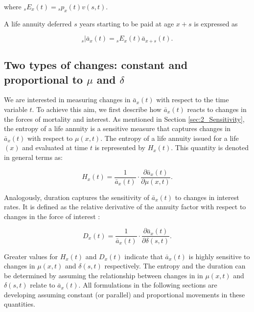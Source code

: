 \documentclass[12pt]{article}
\begin{document}
where ${}_sE_x(t)={}_sp_x(t) {v}(s,t)$. 

A life annuity deferred $s$ years starting to be paid at age $x+s$ is expressed as

\begin{equation}\label{eq:DefAnnuity}
{}_s|\bar{a}_x(t) = {}_sE_x(t) \bar{a}_{x+s}(t).
\end{equation}


\subsection{Two types of changes: constant and proportional to $\mu$ and $\delta$}


We are interested in measuring changes in $\bar{a}_x(t)$ with respect to the time variable $t$. To achieve this aim, we first describe how $\bar{a}_x(t)$ reacts to changes in the forces of mortality and interest. As mentioned in Section \ref{sec:2_Sensitivity}, the entropy of a life annuity is a sensitive measure that captures changes in $\bar{a}_x(t)$ with respect to $\mu(x,t)$. The entropy of a life annuity issued for a life $(x)$ and evaluated at time $t$ is represented by ${H}_{x}(t)$. This quantity is denoted in general terms as:

\begin{equation}\label{eq:EntropyGeneral}
{H}_{x}(t) = \frac{ 1}{\bar{a}_x(t)}\cdot \frac{\partial \bar{a}_x(t) }{\partial \mu(x,t)}.
\end{equation}

Analogously, duration captures the sensitivity of $\bar{a}_x(t)$ to changes in interest rates. It is defined as the relative derivative of the annuity factor with respect to changes in the force of interest \citep{Milevsky2012,Milevsky2012a}:


\begin{equation}\label{eq:DurationGeneral}
{D}_{x}(t) = \frac{1}{\bar{a}_x(t)}\cdot  \frac{\partial \bar{a}_x(t) }{\partial \delta(s,t)}.
\end{equation}

Greater values for ${H}_{x}(t)$ and ${D}_{x}(t)$ indicate that $\bar{a}_x(t)$ is highly sensitive to changes in $\mu(x,t)$ and $\delta(s,t)$ respectively. The entropy and the duration can be determined by assuming the relationship between changes in in $\mu(x,t)$ and $\delta(s,t)$ relate to $\bar{a}_x(t)$. All formulations in the following sections are developing assuming constant (or parallel) and proportional movements in these quantities.
\end{document}
